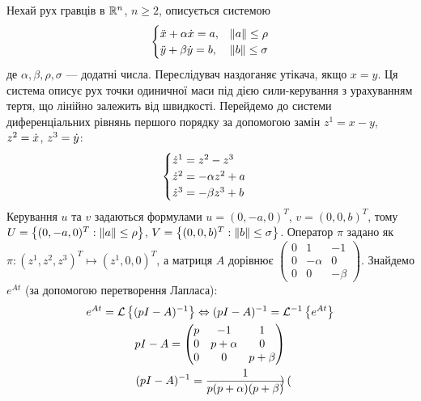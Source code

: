 \begin{example}\label{ex_4_3}
    Нехай рух гравців в $\mathbb{R}^n$, $n\geq 2$, описується системою
    \begin{gather*}
        \begin{cases}
            \ddot{x} + \alpha \dot{x} = a, & \left\Vert a \right\Vert \leq \rho \\
            \ddot{y} + \beta \dot{y} = b, & \left\Vert b \right\Vert \leq \sigma
        \end{cases}
    \end{gather*}
    де $\alpha, \beta, \rho, \sigma$ --- додатні числа. Переслідувач наздоганяє утікача, якщо $x=y$.
    Ця система описує рух точки одиничної маси під дією сили-керування з урахуванням тертя,
    що лінійно залежить від швидкості.
    Перейдемо до системи диференціальних рівнянь першого порядку за допомогою замін $z^1 = x - y$, $z^2 = \dot{x}$, $z^3 = \dot{y}$:
    \begin{gather*}
        \begin{cases}
            \dot{z}^1 = z^2 - z^3 \\
            \dot{z}^2 = -\alpha z^2 + a \\
            \dot{z}^3 = -\beta z^3 + b
        \end{cases}
    \end{gather*}
    Керування $u$ та $v$ задаються формулами $u = (0, -a, 0)^T$, $v = (0, 0, b)^T$, тому
    $U = \left\{(0, -a, 0)^T : \left\Vert a \right\Vert \leq \rho \right\}$, $V = \left\{(0, 0, b)^T : \left\Vert b \right\Vert \leq \sigma \right\}$.
    Оператор $\pi$ задано як $\pi: (z^1, z^2, z^3)^T \mapsto (z^1, 0, 0)^T$, а матриця $A$
    дорівнює $\begin{pmatrix}
        0 & 1 & -1 \\
        0 & -\alpha & 0 \\
        0 & 0 & -\beta
    \end{pmatrix}$. Знайдемо $e^{A t}$ (за допомогою перетворення Лапласа):
    \begin{gather*}
        e^{At} = \mathcal{L}\left\{(pI - A)^{-1}\right\} \Leftrightarrow (pI - A)^{-1} = \mathcal{L}^{-1}\left\{e^{At}\right\} \\
        pI - A = \begin{pmatrix}
            p & -1 & 1 \\
            0 & p+\alpha & 0 \\
            0 & 0 & p + \beta \\
        \end{pmatrix} \\
        (pI - A)^{-1} = \frac{1}{p(p+\alpha)(p+\beta)}\begin{pmatrix}

\end{pmatrix}
\end{gather*}
\end{example}
